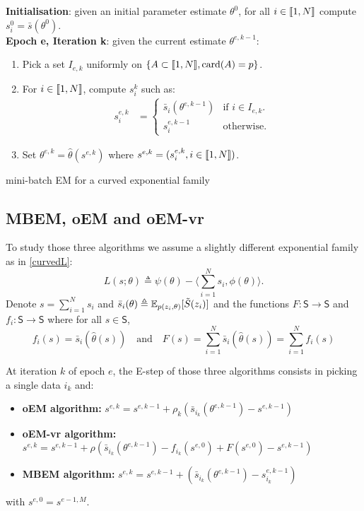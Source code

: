 \begin{algorithm}[H]
\textbf{Initialisation}: given an initial parameter estimate $\theta^0$, for all $i \in \llbracket1,N\rrbracket$ compute $s^0_i = \bar{s}(\theta^0)$.\\
\textbf{Epoch e, Iteration k}: given the current estimate $\theta^{e,k-1}$:
\begin{enumerate}
\item Pick a set $I_{e,k}$ uniformly on $\{A \subset \llbracket1,N\rrbracket, \operatorname{card}(A)=p\}$.
\item For $i \in \llbracket1,N\rrbracket$, compute $s^k_{i}$ such as:
\begin{align}
 s^{e,k}_i &=
  \begin{cases}
   \bar{s}_i(\theta^{e,k-1})    & \text{if } i \in I_{e,k}.\\
   s^{e,k-1}_i                               & \text{otherwise}.
  \end{cases}
\end{align}

\item Set $\theta^{e,k} = \hat{\theta}(s^{e,k})$ where $s^{e,k} = (s^{e,k}_i, i \in \llbracket1,N\rrbracket)$.

\end{enumerate}
\caption{mini-batch EM for a curved exponential family}
\label{alg:mbem-expo}
\end{algorithm}

\subsection{MBEM, oEM and oEM-vr}
To study those three algorithms we assume a slightly different exponential family as in \eqref{curvedL}:
\begin{equation}\label{curvedL}
L(s;\theta) \triangleq \psi(\theta) - \langle \sum_{i=1}^N{s_i}, \phi(\theta)\rangle.
\end{equation}
Denote $s = \sum_{i=1}^N{s_i}$ and $\bar{s}_i(\theta) \triangleq \operatorname*{\mathbb{E}}_{p(z_i, \theta)}[\tilde{S}(z_i)]$ and the functions $F: \mathsf{S} \to \mathsf{S}$ and $f_i: \mathsf{S} \to \mathsf{S}$ where for all $s \in  \mathsf{S}$, 
$$f_i(s) = \bar{s}_i (\hat{\theta}(s)) \quad \textrm{and} \quad F(s) = \sum_{i=1}^N \bar{s}_i (\hat{\theta}(s)) = \sum_{i=1}^N f_i (s)$$

At iteration $k$ of epoch $e$, the E-step of those three algorithms consists in picking a single data $i_k$ and:
\begin{itemize}
\item \textbf{oEM algorithm:}  $s^{e,k} = s^{e,k-1} + \rho_k ( \bar{s}_{i_k}(\theta^{e,k-1})  - s^{e,k-1} )$
\item \textbf{oEM-vr algorithm: }  $s^{e,k} = s^{e,k-1} + \rho ( \bar{s}_{i_k}(\theta^{e,k-1}) - f_{i_k}(s^{e,0})+ F(s^{e,0}) - s^{e,k-1} )$
\item \textbf{MBEM algorithm: }  $s^{e,k} = s^{e,k-1} +  ( \bar{s}_{i_k}(\theta^{e,k-1})  - s_{i_k}^{e,k-1} )$
\end{itemize}
with $ s^{e,0}  = s^{e-1,M}$.

